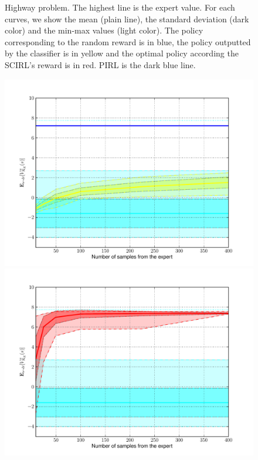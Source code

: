 \documentclass[english,utf8]{./hermes-journal}
\begin{document}
\begin{figure}[fig:res]{Highway problem. The highest line is the expert value. For each curves, we show the mean (plain line), the standard deviation (dark color) and the min-max values (light color). The policy corresponding to the random reward is in blue, the policy outputted by the  classifier is in yellow and the optimal policy according the SCIRL's reward is in red. PIRL is the dark blue line.}
\begin{minipage}[l]{0.45\linewidth}
\centering
  \centerline{\includegraphics[width=.92\linewidth]{fig_classif.pdf}}
\end{minipage} \hfill
\begin{minipage}[r]{0.45\linewidth}
\centering
  \centerline{\includegraphics[width=.92\linewidth]{fig_scirl.pdf}}
\end{minipage}
\end{figure}
\end{document}
